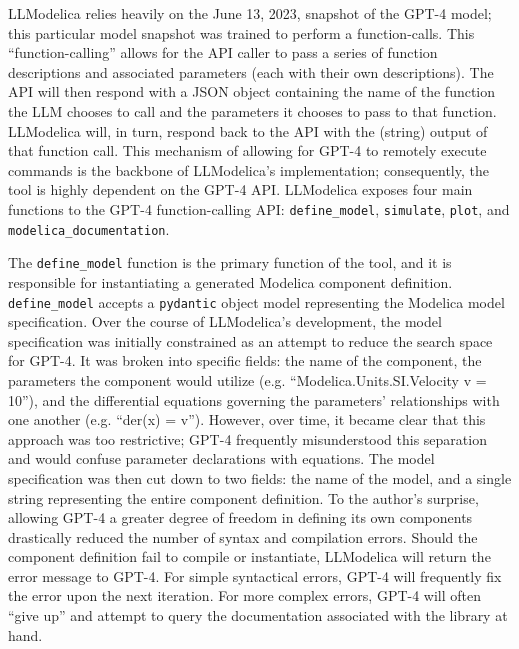 \documentclass[11pt]{article}
\begin{document}
LLModelica relies heavily on the June 13, 2023, snapshot of the GPT-4 model; this particular model snapshot was trained to perform a function-calls. This ``function-calling'' allows for the API caller to pass a series of function descriptions and associated parameters (each with their own descriptions). The API will then respond with a JSON object containing the name of the function the LLM chooses to call and the parameters it chooses to pass to that function. LLModelica will, in turn, respond back to the API with the (string) output of that function call. This mechanism of allowing for GPT-4 to remotely execute commands is the backbone of LLModelica's implementation; consequently, the tool is highly dependent on the GPT-4 API. LLModelica exposes four main functions to the GPT-4 function-calling API: \texttt{define\_model}, \texttt{simulate}, \texttt{plot}, and \texttt{modelica\_documentation}.

The \texttt{define\_model} function is the primary function of the tool, and it is responsible for instantiating a generated Modelica component definition. \texttt{define\_model} accepts a \texttt{pydantic} object model representing the Modelica model specification. Over the course of LLModelica's development, the model specification was initially constrained as an attempt to reduce the search space for GPT-4. It was broken into specific fields: the name of the component, the parameters the component would utilize (e.g. ``Modelica.Units.SI.Velocity v = 10''), and the differential equations governing the parameters' relationships with one another (e.g. ``der(x) = v''). However, over time, it became clear that this approach was too restrictive; GPT-4 frequently misunderstood this separation and would confuse parameter declarations with equations. The model specification was then cut down to two fields: the name of the model, and a single string representing the entire component definition. To the author's surprise, allowing GPT-4 a greater degree of freedom in defining its own components drastically reduced the number of syntax and compilation errors. Should the component definition fail to compile or instantiate, LLModelica will return the error message to GPT-4. For simple syntactical errors, GPT-4 will frequently fix the error upon the next iteration. For more complex errors, GPT-4 will often ``give up'' and attempt to query the documentation associated with the library at hand.
\end{document}
